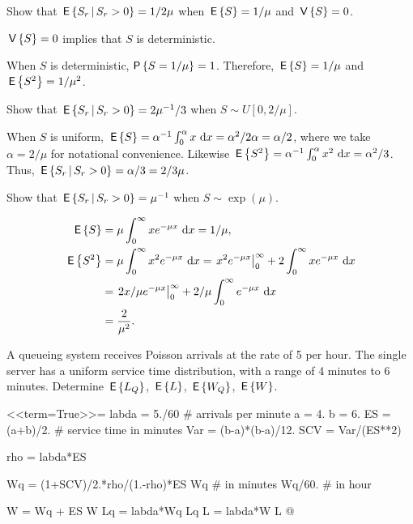 \begin{exercise}
Show that  $\,\mathsf{E}\left\{S_r\,\middle|\, S_r>0\right\} = 1/2\mu$
  when $\,\mathsf{E}\left\{S\right\}=1/\mu$ and $\,\mathsf{V}\left\{S\right\} = 0$.
  \begin{hint}
    $\,\mathsf{V}\left\{S\right\} = 0$ implies that $S$ is deterministic.
  \end{hint}
\begin{solution}
 When $S$ is deterministic, $\P{S=1/\mu} = 1$. Therefore, $\,\mathsf{E}\left\{S\right\}=1/\mu$ and $\,\mathsf{E}\left\{S^2\right\} = 1/\mu^2$. 
\end{solution}
\end{exercise}

\begin{exercise}
Show that $\,\mathsf{E}\left\{S_r\,\middle|\, S_r>0\right\} = 2\mu^{-1}/3$ when  $S \sim U[0,2/\mu]$.
\begin{solution}
 When $S$ is uniform,
    $\,\mathsf{E}\left\{S\right\} = \alpha^{-1}\int_0^\alpha x \, \,\text{d}x =\alpha^2/2 \alpha =
    \alpha/2$,
    where we take $\alpha =2/\mu$ for notational convenience. Likewise $\,\mathsf{E}\left\{S^2\right\} = \alpha^{-1}\int_0^\alpha x^2 \, \,\text{d}x = \alpha^2/3$. Thus, $\,\mathsf{E}\left\{S_r\,\middle|\, S_r>0\right\} = \alpha/3 = 2/3\mu$.
\end{solution}
\end{exercise}

\begin{exercise}
 Show that $\,\mathsf{E}\left\{S_r\,\middle|\, S_r>0\right\} = \mu^{-1}$ when $S\sim \exp(\mu)$.
\begin{solution}
    \begin{align*}
\,\mathsf{E}\left\{S\right\} &= \mu \int_0^\infty x e^{-\mu x}\,\,\text{d}x = 1/\mu, \\
\,\mathsf{E}\left\{S^2\right\} 
&= \mu \int_0^\infty x^2 e^{- \mu x} \,\,\text{d}x = \left. x^2 e^{-\mu x} \right|_0^\infty + 2 \int_0^\infty x e^{-\mu x} \, \,\text{d}x \\
&= \left. 2x/\mu e^{-\mu x} \right|_0^\infty + 2/\mu\int_0^\infty e^{-\mu x} \, \,\text{d}x\\
&=\frac2{\mu^2}.
    \end{align*}
\end{solution}
\end{exercise}


\begin{exercise}
  A queueing system receives Poisson arrivals at the rate of 5 per
  hour. The single server has a uniform service time distribution,
  with a range of 4 minutes to 6 minutes. Determine $\,\mathsf{E}\left\{L_Q\right\}$, $\,\mathsf{E}\left\{L\right\}$,
  $\,\mathsf{E}\left\{W_Q\right\}$, $\,\mathsf{E}\left\{W\right\}$.
  \begin{solution}

<<term=True>>=
labda = 5./60 # arrivals per minute
a = 4.
b = 6.
ES = (a+b)/2.  # service time in minutes
Var = (b-a)*(b-a)/12.
SCV = Var/(ES**2)

rho = labda*ES

Wq = (1+SCV)/2.*rho/(1.-rho)*ES
Wq # in minutes
Wq/60. # in hour


W = Wq + ES
W
Lq = labda*Wq
Lq
L = labda*W
L
@ 
  \end{solution}
\end{exercise}



